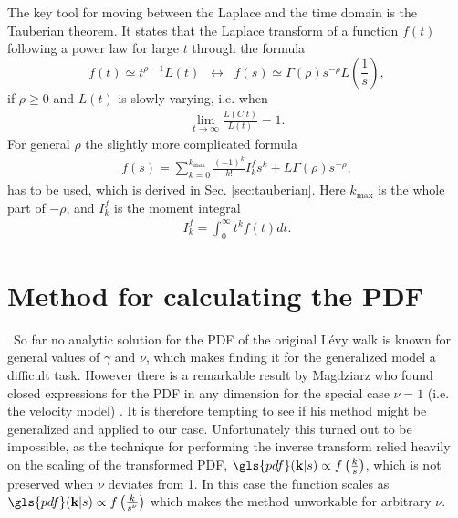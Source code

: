 The key tool for moving between the Laplace and the time domain is the Tauberian theorem. It states that the Laplace transform of a function $f(t)$ following a power law for large $t$ through the formula 
\cite{firstSteps}
% 
{\color{red}
\begin{equation}
 f(t) \simeq t^{\rho-1} L(t) \;\; \leftrightarrow \;\; f(s) \simeq \Gamma(\rho) s^{-\rho} L\left(\frac{1}{s}\right) \label{eqn:tauberian} ,
\end{equation}
}
%
if $\rho \geq 0 $ and $L(t)$ is slowly varying, i.e. when
%
\begin{align}
\lim_{t \to \infty} \frac{L(C \; t)}{L(t)} = 1 .
\end{align}
%
For general $\rho$ the slightly more complicated formula 
%
\begin{align}
 f(s) = \sum_{k=0}^{k_{\max}} \frac{(-1)^k}{k!} I^{f}_k s^k + L \Gamma(\rho) s^{-\rho} ,
 \label{eqn:generalTauberian}
\end{align}
%
has to be used, which is derived in Sec. \ref{sec:tauberian}. Here $k_{\max}$ is the whole part of $-\rho$, and $I^{f}_k$ is the moment integral
%
\begin{align}
I^{f}_k = \int_0^\infty t^k f(t) dt.
\end{align}



\section{Method for calculating the PDF}

{\color{blue} \
So far no analytic solution for the \gls{PDF} of the original L\'evy walk is known for general values of $\gamma$ and $\nu$, which makes finding it for the generalized model a difficult task.
} 
However there is a remarkable result by Magdziarz who found closed expressions for the \gls{PDF} in any dimension for the special case $\nu=1$ (i.e. the velocity model) 
\cite{magdziarz2015, magdziarz2016}. 
It is therefore tempting to see if his method might be generalized and applied to our case. Unfortunately this turned out to be impossible, as the technique for performing the inverse transform relied heavily on the scaling of the transformed \gls{PDF}, $\gls{pdf}(\ve{k}|s) \propto f\left( \frac{k}{s} \right)$, which is not preserved when $\nu$ deviates from 1. In this case the function scales as $\gls{pdf}(\ve{k}|s) \propto f\left(\frac{k}{s^{\nu}} \right)$ which makes the method unworkable for arbitrary $\nu$.

